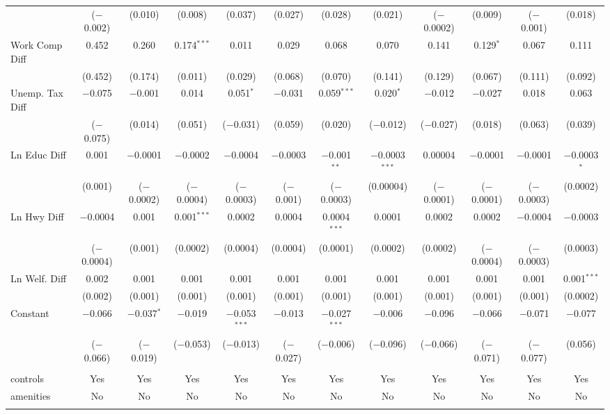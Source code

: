 \begin{table}[!htbp]
\begin{tabular}{@{\extracolsep{5pt}}lccccccccccc}
  & ($-$0.002) & (0.010) & (0.008) & (0.037) & (0.027) & (0.028) & (0.021) & ($-$0.0002) & (0.009) & ($-$0.001) & (0.018) \\ 
  Work Comp Diff & 0.452 & 0.260 & 0.174$^{***}$ & 0.011 & 0.029 & 0.068 & 0.070 & 0.141 & 0.129$^{*}$ & 0.067 & 0.111 \\ 
  & (0.452) & (0.174) & (0.011) & (0.029) & (0.068) & (0.070) & (0.141) & (0.129) & (0.067) & (0.111) & (0.092) \\ 
  Unemp. Tax Diff & $-$0.075 & $-$0.001 & 0.014 & 0.051$^{*}$ & $-$0.031 & 0.059$^{***}$ & 0.020$^{*}$ & $-$0.012 & $-$0.027 & 0.018 & 0.063 \\ 
  & ($-$0.075) & (0.014) & (0.051) & ($-$0.031) & (0.059) & (0.020) & ($-$0.012) & ($-$0.027) & (0.018) & (0.063) & (0.039) \\ 
  Ln Educ Diff & 0.001 & $-$0.0001 & $-$0.0002 & $-$0.0004 & $-$0.0003 & $-$0.001$^{**}$ & $-$0.0003$^{***}$ & 0.00004 & $-$0.0001 & $-$0.0001 & $-$0.0003$^{*}$ \\ 
  & (0.001) & ($-$0.0002) & ($-$0.0004) & ($-$0.0003) & ($-$0.001) & ($-$0.0003) & (0.00004) & ($-$0.0001) & ($-$0.0001) & ($-$0.0003) & (0.0002) \\ 
  Ln Hwy Diff & $-$0.0004 & 0.001 & 0.001$^{***}$ & 0.0002 & 0.0004 & 0.0004$^{***}$ & 0.0001 & 0.0002 & 0.0002 & $-$0.0004 & $-$0.0003 \\ 
  & ($-$0.0004) & (0.001) & (0.0002) & (0.0004) & (0.0004) & (0.0001) & (0.0002) & (0.0002) & ($-$0.0004) & ($-$0.0003) & (0.0003) \\ 
  Ln Welf. Diff & 0.002 & 0.001 & 0.001 & 0.001 & 0.001 & 0.001 & 0.001 & 0.001 & 0.001 & 0.001 & 0.001$^{***}$ \\ 
  & (0.002) & (0.001) & (0.001) & (0.001) & (0.001) & (0.001) & (0.001) & (0.001) & (0.001) & (0.001) & (0.0002) \\ 
  Constant & $-$0.066 & $-$0.037$^{*}$ & $-$0.019 & $-$0.053$^{***}$ & $-$0.013 & $-$0.027$^{***}$ & $-$0.006 & $-$0.096 & $-$0.066 & $-$0.071 & $-$0.077 \\ 
  & ($-$0.066) & ($-$0.019) & ($-$0.053) & ($-$0.013) & ($-$0.027) & ($-$0.006) & ($-$0.096) & ($-$0.066) & ($-$0.071) & ($-$0.077) & (0.056) \\ 
 \hline \\[-1.8ex] 
controls & Yes & Yes & Yes & Yes & Yes & Yes & Yes & Yes & Yes & Yes & Yes \\ 
amenities & No & No & No & No & No & No & No & No & No & No & No \\ 
\hline \\[-1.8ex] 

\end{tabular}
\end{table}

